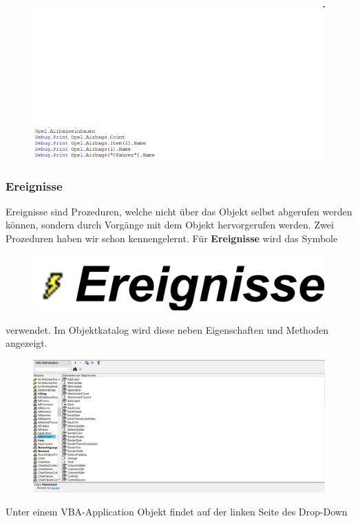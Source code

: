 \begin{figure}[H]
	\centering
	\includegraphics[scale = 0.3]{attachment/chapter_2/Scc046}
	\caption{}
	\label{fig:Scc046}
\end{figure}
\subsubsection{Ereignisse}
Ereignisse sind Prozeduren, welche nicht über das Objekt selbst abgerufen werden können, sondern durch Vorgänge mit dem Objekt hervorgerufen werden.
Zwei Prozeduren haben wir schon kennengelernt. Für \textbf{Ereignisse} wird das Symbole
\begin{figure}[H]
	\centering
	\includegraphics[scale = 0.3]{attachment/chapter_2/Scc052}
	\caption{}
	\label{fig:Scc052}
\end{figure}
verwendet. Im Objektkatalog wird diese neben Eigenschaften und Methoden angezeigt.
\begin{figure}[H]
	\centering
	\includegraphics[scale = 0.3]{attachment/chapter_2/Scc051}
	\caption{}
	\label{fig:Scc051}
\end{figure}
Unter einem VBA-Application Objekt findet auf der linken Seite des Drop-Down
